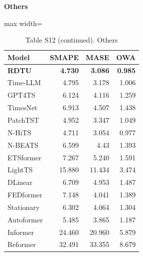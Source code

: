 \begin{table}[H]\centering\small
\caption*{Table S12 (continued). Others}
\textbf{Others}\par\smallskip
\begin{adjustbox}{max width=\linewidth}\begin{tabular}{lrrr}\toprule
\textbf{Model} & \textbf{SMAPE} & \textbf{MASE} & \textbf{OWA}\\\midrule
\rowcolor{blue!5}
\textbf{RDTU} & \textbf{4.730} & \textbf{3.086} & \textbf{0.985}\\
Time-LLM & 4.795 & 3.178 & 1.006\\
GPT4TS & 6.124 & 4.116 & 1.259\\
TimesNet & 6.913 & 4.507 & 1.438\\
PatchTST & 4.952 & 3.347 & 1.049\\
N-HiTS & 4.711 & 3.054 & 0.977\\
N-BEATS & 6.599 & 4.43 & 1.393\\
ETSformer & 7.267 & 5.240 & 1.591\\
LightTS & 15.880 & 11.434 & 3.474\\
DLinear & 6.709 & 4.953 & 1.487\\
FEDformer & 7.148 & 4.041 & 1.389\\
Stationary & 6.302 & 4.064 & 1.304\\
Autoformer & 5.485 & 3.865 & 1.187\\
Informer & 24.460 & 20.960 & 5.879\\
Reformer & 32.491 & 33.355 & 8.679\\
\bottomrule\end{tabular}\end{adjustbox}\end{table}
